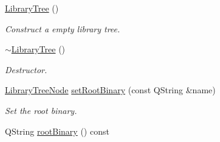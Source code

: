 \begin{DoxyCompactItemize}
\item 
\hyperlink{class_mdt_1_1_deploy_utils_1_1_library_tree_a5e2c5933e88786b6e67709c2887e15de}{Library\+Tree} ()\hypertarget{class_mdt_1_1_deploy_utils_1_1_library_tree_a5e2c5933e88786b6e67709c2887e15de}{}\label{class_mdt_1_1_deploy_utils_1_1_library_tree_a5e2c5933e88786b6e67709c2887e15de}

\begin{DoxyCompactList}\small\item\em Construct a empty library tree. \end{DoxyCompactList}\item 
\hyperlink{class_mdt_1_1_deploy_utils_1_1_library_tree_a6682b1ebd66c94223cd3b43f5c4878f3}{$\sim$\+Library\+Tree} ()\hypertarget{class_mdt_1_1_deploy_utils_1_1_library_tree_a6682b1ebd66c94223cd3b43f5c4878f3}{}\label{class_mdt_1_1_deploy_utils_1_1_library_tree_a6682b1ebd66c94223cd3b43f5c4878f3}

\begin{DoxyCompactList}\small\item\em Destructor. \end{DoxyCompactList}\item 
\hyperlink{class_mdt_1_1_deploy_utils_1_1_library_tree_node}{Library\+Tree\+Node} \hyperlink{class_mdt_1_1_deploy_utils_1_1_library_tree_ab11aef58e0492638f23169073820ffac}{set\+Root\+Binary} (const Q\+String \&name)
\begin{DoxyCompactList}\small\item\em Set the root binary. \end{DoxyCompactList}\item 
Q\+String \hyperlink{class_mdt_1_1_deploy_utils_1_1_library_tree_ac58cd1beebbbb7c8b1606670e38d2a69}{root\+Binary} () const \hypertarget{class_mdt_1_1_deploy_utils_1_1_library_tree_ac58cd1beebbbb7c8b1606670e38d2a69}{}\label{class_mdt_1_1_deploy_utils_1_1_library_tree_ac58cd1beebbbb7c8b1606670e38d2a69}


\end{DoxyCompactItemize}

